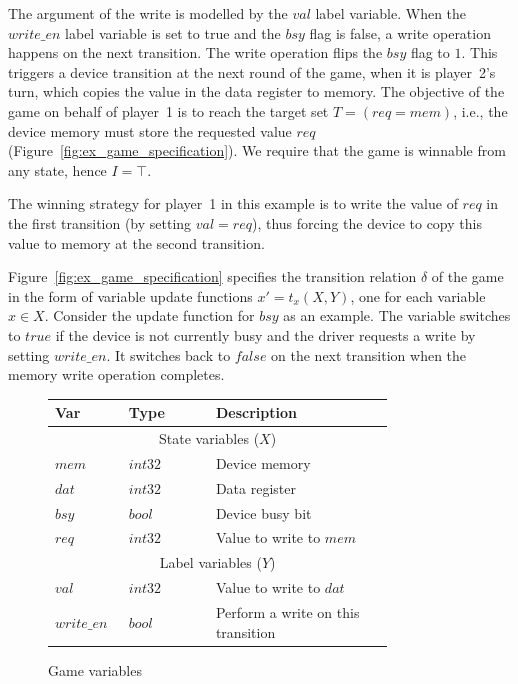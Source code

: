The argument of the write is modelled by the $val$ label variable. When the $write\_en$ label variable is set to true and the $bsy$ flag is false, a write operation happens on the next transition. The write operation flips the $bsy$ flag to $1$.  This triggers a device transition at the next round of the game, when it is player~2's turn, which copies the value in the data register to memory.  The objective of the game on behalf of player~1 is to reach the target set $T=(req=mem)$, i.e., the device memory must store the requested value $req$ (Figure~\ref{fig:ex_game_specification}).  We require that the game is winnable from any state, hence $I=\top$.  

The winning strategy for player~1 in this example is to write the value of $req$ in the first transition (by setting $val=req$), thus forcing the device to copy this value to memory at the second transition.

Figure~\ref{fig:ex_game_specification} specifies the transition relation $\delta$ of the game in the form of variable update functions $x' = t_x(X,Y)$, one for each variable $x\in X$.  Consider the update function for $bsy$ as an example.  The variable switches to $true$ if the device is not currently busy and the driver requests a write by setting $write\_en$. It switches back to $false$ on the next transition when the memory write operation completes.

\begin{figure}
    \centering
    \caption{Game variables}
    \label{fig:ex_game_variables}
    \begin{tabular}{|p{0.13\linewidth}p{0.22\linewidth}p{0.45\linewidth}|}
        \hline
        {\bf Var} & {\bf Type} & {\bf Description} \\
        \hline\hline
        \multicolumn{3}{|c|}{State variables ($X$)} \\
        \hline
        $mem$ & $int32$ & Device memory           \\
        $dat$ & $int32$ & Data register           \\
        $bsy$ & $bool$  & Device busy bit         \\
        $req$ & $int32$ & Value to write to $mem$ \\
        \hline\hline
        \multicolumn{3}{|c|}{Label variables ($Y$)}    \\
        \hline
        $val$       & $int32$ & Value to write to $dat$ \\
        $write\_en$ & $bool$  & Perform a write on this transition \\
        \hline
    \end{tabular}
\end{figure}

